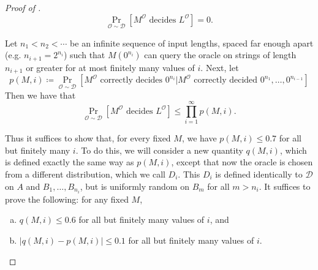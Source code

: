 \documentclass[10pt,a4paper]{article}
\begin{document}
\begin{proof}[Proof of ]
\[
\Pr_{\mathcal{O}\sim\mathcal{D}}\left[M^\mathcal{O} \text{ decides } L^\mathcal{O}\right]=0.
\]

Let $n_1<n_2<\cdots$ be an infinite sequence of input lengths, spaced far enough apart (e.g. $n_{i+1}=2^{n_i}$) such that $M\left(0^{n_i}\right)$ can query the oracle on strings of length $n_{i+1}$ or greater for at most finitely many values of $i$. Next, let
\[
p(M,i)\coloneqq\Pr_{\mathcal{O}\sim\mathcal{D}}\left[M^\mathcal{O} \text{ correctly decides } 0^{n_i}|M^\mathcal{O} \text{ correctly decided }0^{n_1},\dots,0^{n_{i-1}}\right]
\]
Then we have that
\[
\Pr_{\mathcal{O}\sim\mathcal{D}}\left[M^\mathcal{O}\text{ decides }L^\mathcal{O}\right]\leq\prod_{i=1}^\infty p(M,i).
\]

\noindent Thus it suffices to show that, for every fixed $M$, we have $p(M,i)\leq 0.7$ for all but finitely many $i$. To do this, we will consider a new quantity $q(M,i)$, which is defined exactly the same way as $p(M,i)$, except that now the oracle is chosen from a different distribution, which we call $D_i$. This $D_i$ is defined identically to $\mathcal{D}$ on $A$ and $B_1, \ldots, B_{n_i}$, but is uniformly random on $B_m$ for all $m > n_i$. It suffices to prove the following: for any fixed $M$,
\begin{enumerate}[(a)]
    \item $q(M,i)\leq 0.6$ for all but finitely many values of $i$, and
    \item $|q(M,i)-p(M,i)|\leq 0.1$ for all but finitely many values of $i$.
\end{enumerate}


\end{proof}
\end{document}
